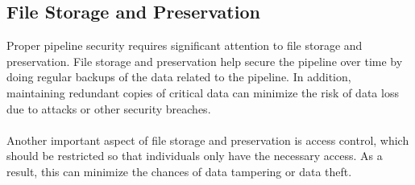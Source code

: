 \subsection{File Storage and Preservation}
Proper pipeline security requires significant attention to file storage and preservation. File storage and preservation help secure the pipeline over time by doing regular backups of the data related to the pipeline. In addition, maintaining redundant copies of critical data can minimize the risk of data loss due to attacks or other security breaches. 
\\~\\
Another important aspect of file storage and preservation is access control, which should be restricted so that individuals only have the necessary access. As a result, this can minimize the chances of data tampering or data theft.

